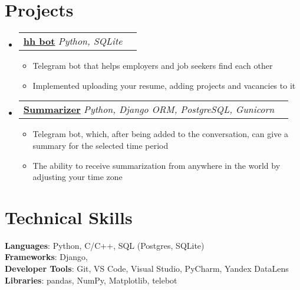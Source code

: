 \documentclass[letterpaper,11pt]{article}
\makeatletter
\newcommand{\resumeItem}[1]{
  \item\small{
    {#1 \vspace{-2pt}}
  }
}
\newcommand{\resumeProjectHeading}[2]{
    \item
    \begin{tabular*}{0.97\textwidth}{l@{\extracolsep{\fill}}r}
      \small#1 & #2 \\
    \end{tabular*}\vspace{-7pt}
}
\newcommand{\resumeSubHeadingListStart}{\begin{itemize}[leftmargin=0.15in, label={}]}
\newcommand{\resumeSubHeadingListEnd}{\end{itemize}}
\newcommand{\resumeItemListStart}{\begin{itemize}}
\newcommand{\resumeItemListEnd}{\end{itemize}\vspace{-5pt}}
\makeatother
\begin{document}
\section{Projects}
    \resumeSubHeadingListStart
      \resumeProjectHeading
        {\textbf{\href{https://github.com/NovikovArtur/hh_bot_for_hse}{hh bot}}
          \emph{Python, SQLite}}{}
          \resumeItemListStart
            \resumeItem{Telegram bot that helps employers and job seekers find each other}
            \resumeItem{Implemented uploading your resume, adding projects and vacancies to it}
          \resumeItemListEnd
      \resumeProjectHeading
        {\textbf{\href{https://t.me/summarisatorBot}{Summarizer}}
          \emph{Python, Django ORM, PostgreSQL, Gunicorn}}{}
          \resumeItemListStart
            \resumeItem{Telegram bot, which, after being added to the conversation, can give a summary for the selected time period}
            \resumeItem{The ability to receive summarization from anywhere in the world by adjusting your time zone}
          \resumeItemListEnd
    \resumeSubHeadingListEnd



%
\section{Technical Skills}
 \begin{itemize}[leftmargin=0.15in, label={}]
    \small{\item{
     \textbf{Languages}{: Python, C/C++, SQL (Postgres, SQLite)} \\
     \textbf{Frameworks}{: Django, } \\
     \textbf{Developer Tools}{: Git, VS Code, Visual Studio, PyCharm, Yandex DataLens} \\
     \textbf{Libraries}{: pandas, NumPy, Matplotlib, telebot}
    }}
 \end{itemize}


\end{document}
